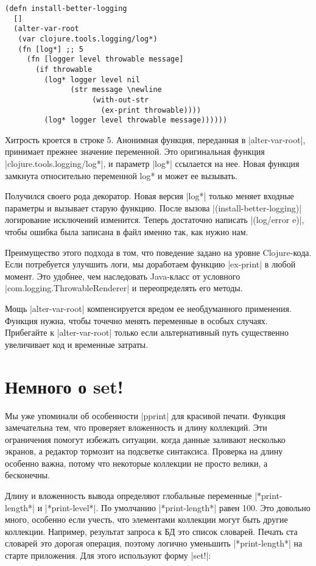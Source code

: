 \begin{verbatim}
(defn install-better-logging
  []
  (alter-var-root
   (var clojure.tools.logging/log*)
   (fn [log*] ;; 5
     (fn [logger level throwable message]
       (if throwable
         (log* logger level nil
               (str message \newline
                    (with-out-str
                      (ex-print throwable))))
         (log* logger level throwable message))))))
\end{verbatim}

Хитрость кроется в строке 5. Анонимная функция, переданная в \spverb|alter-var-root|,
принимает прежнее значение переменной. Это оригинальная функция
\spverb|clojure.tools.logging/log*|, и параметр \spverb|log*| ссылается на нее. Новая функция
замкнута относительно переменной log* и может ее вызывать.

Получился своего рода декоратор. Новая версия \spverb|log*| только меняет входные
параметры и вызывает старую функцию. После вызова \spverb|(install-better-logging)|
логирование исключений изменится. Теперь достаточно написать \spverb|(log/error e)|,
чтобы ошибка была записана в файл именно так, как нужно нам.

Преимущество этого подхода в том, что поведение задано на уровне
Clojure-кода. Если потребуется улучшить логи, мы доработаем функцию \spverb|ex-print| в
любой момент. Это удобнее, чем наследовать Java-класс от условного
\spverb|com.logging.ThrowableRenderer| и переопределять его методы.

Мощь \spverb|alter-var-root| компенсируется вредом ее необдуманного применения. Функция
нужна, чтобы точечно менять переменные в особых случаях. Прибегайте к
\spverb|alter-var-root| только если альтернативный путь существенно увеличивает код и
временные затраты.

\section{Немного о set!}

Мы уже упоминали об особенности \spverb|pprint| для красивой печати. Функция
замечательна тем, что проверяет вложенность и длину коллекций. Эти ограничения
помогут избежать ситуации, когда данные заливают несколько экранов, а редактор
тормозит на подсветке синтаксиса. Проверка на длину особенно важна, потому что
некоторые коллекции не просто велики, а бесконечны.

Длину и вложенность вывода определяют глобальные переменные \spverb|*print-length*| и
\spverb|*print-level*|. По умолчанию \spverb|*print-length*| равен 100. Это довольно много,
особенно если учесть, что элементами коллекции могут быть другие
коллекции. Например, результат запроса к БД это список словарей. Печать ста
словарей это дорогая операция, поэтому логично уменьшить \spverb|*print-length*| на
старте приложения. Для этого используют форму \spverb|set!|:


